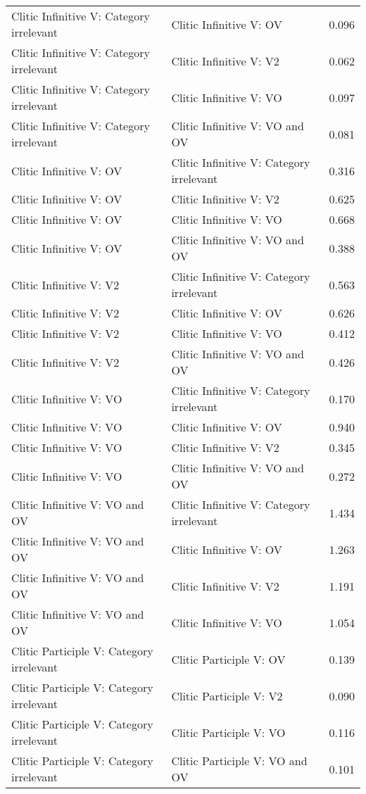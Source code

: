 \begin{longtable}{p{.4\linewidth}p{.4\linewidth}p{.1\linewidth}}
Clitic Infinitive V: Category irrelevant & Clitic Infinitive V: OV & 0.096\\
Clitic Infinitive V: Category irrelevant & Clitic Infinitive V: V2 & 0.062\\
Clitic Infinitive V: Category irrelevant & Clitic Infinitive V: VO & 0.097\\
Clitic Infinitive V: Category irrelevant & Clitic Infinitive V: VO and OV & 0.081\\
Clitic Infinitive V: OV & Clitic Infinitive V: Category irrelevant & 0.316\\
Clitic Infinitive V: OV & Clitic Infinitive V: V2 & 0.625\\
Clitic Infinitive V: OV & Clitic Infinitive V: VO & 0.668\\
Clitic Infinitive V: OV & Clitic Infinitive V: VO and OV & 0.388\\
Clitic Infinitive V: V2 & Clitic Infinitive V: Category irrelevant & 0.563\\
Clitic Infinitive V: V2 & Clitic Infinitive V: OV & 0.626\\
Clitic Infinitive V: V2 & Clitic Infinitive V: VO & 0.412\\
Clitic Infinitive V: V2 & Clitic Infinitive V: VO and OV & 0.426\\
Clitic Infinitive V: VO & Clitic Infinitive V: Category irrelevant & 0.170\\
Clitic Infinitive V: VO & Clitic Infinitive V: OV & 0.940\\
Clitic Infinitive V: VO & Clitic Infinitive V: V2 & 0.345\\
Clitic Infinitive V: VO & Clitic Infinitive V: VO and OV & 0.272\\
Clitic Infinitive V: VO and OV & Clitic Infinitive V: Category irrelevant & 1.434\\
Clitic Infinitive V: VO and OV & Clitic Infinitive V: OV & 1.263\\
Clitic Infinitive V: VO and OV & Clitic Infinitive V: V2 & 1.191\\
Clitic Infinitive V: VO and OV & Clitic Infinitive V: VO & 1.054\\
Clitic Participle V: Category irrelevant & Clitic Participle V: OV & 0.139\\
Clitic Participle V: Category irrelevant & Clitic Participle V: V2 & 0.090\\
Clitic Participle V: Category irrelevant & Clitic Participle V: VO & 0.116\\
Clitic Participle V: Category irrelevant & Clitic Participle V: VO and OV & 0.101\\

\end{longtable}
